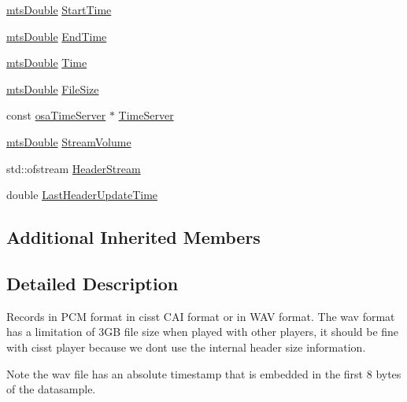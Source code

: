 \begin{DoxyCompactItemize}
\item 
\hyperlink{mts_generic_object_proxy_8h_a31e76b0190a8d3f9838626cd7b47bd75}{mts\+Double} \hyperlink{classmts_open_a_l_record_ab57135f4e6a6339382521b416e1ed914}{Start\+Time}
\item 
\hyperlink{mts_generic_object_proxy_8h_a31e76b0190a8d3f9838626cd7b47bd75}{mts\+Double} \hyperlink{classmts_open_a_l_record_a72313b9ec76ec2abd90ac514c1d2b515}{End\+Time}
\item 
\hyperlink{mts_generic_object_proxy_8h_a31e76b0190a8d3f9838626cd7b47bd75}{mts\+Double} \hyperlink{classmts_open_a_l_record_af6104f48da53ce5733a1a888520d38a1}{Time}
\item 
\hyperlink{mts_generic_object_proxy_8h_a31e76b0190a8d3f9838626cd7b47bd75}{mts\+Double} \hyperlink{classmts_open_a_l_record_a37028bf96b8e119b15db1b2edad8bd7c}{File\+Size}
\item 
const \hyperlink{classosa_time_server}{osa\+Time\+Server} $\ast$ \hyperlink{classmts_open_a_l_record_a91de11a3551290c23f912ebe998981ca}{Time\+Server}
\item 
\hyperlink{mts_generic_object_proxy_8h_a31e76b0190a8d3f9838626cd7b47bd75}{mts\+Double} \hyperlink{classmts_open_a_l_record_a36e814f3bb80ef27231bebaabca3f75d}{Stream\+Volume}
\item 
std\+::ofstream \hyperlink{classmts_open_a_l_record_a61c9f1c9a9e20ca8c2e6085c96dfc30f}{Header\+Stream}
\item 
double \hyperlink{classmts_open_a_l_record_a9c0c43fcbd4f722395a179a006a49714}{Last\+Header\+Update\+Time}
\end{DoxyCompactItemize}
\subsection*{Additional Inherited Members}


\subsection{Detailed Description}
Records in P\+C\+M format in cisst C\+A\+I format or in W\+A\+V format. The wav format has a limitation of 3\+G\+B file size when played with other players, it should be fine with cisst player because we don\textquotesingle{}t use the internal header size information. \begin{DoxyNote}{Note}
the wav file has an absolute timestamp that is embedded in the first 8 bytes of the datasample. 
\end{DoxyNote}


